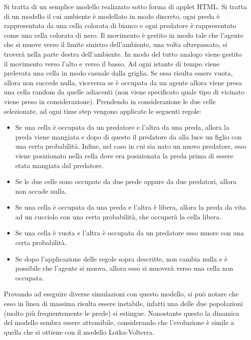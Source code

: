 \documentclass[11pt]{article}
\begin{document}
Si tratta di un semplice modello realizzato sotto forma di applet HTML. Si tratta di un modello il cui ambiente è modellato in modo discreto, ogni preda è rappresentata da una cella colorata di bianco e ogni predatore è rappresentato come una cella colorata di nero. Il movimento è gestito in modo tale che l'agente che si muove verso il limite sinistro dell'ambiente, una volta oltrepassato, si troverà nella parte destra dell'ambiente. In modo del tutto analogo viene gestito il movimento verso l'alto e verso il basso. Ad ogni istante di tempo viene prelevata una cella in modo casuale dalla griglia. Se essa risulta essere vuota, allora non succede nulla, viceversa se è occupata da un agente allora viene presa una cella random da quelle adiacenti (non viene specificato quale tipo di vicinato viene preso in considerazione). Prendendo in considerazione le due celle selezionate, ad ogni time step vengono applicate le seguenti regole\cite{PhysicsofRisk}:
\begin{itemize}
    \item Se una cella è occupata da un predatore e l'altra da una preda, allora la preda viene mangiata e dopo di questo il predatore da alla luce un figlio con una certa probabilità. Infine, nel caso in cui sia nato un nuovo predatore, esso viene posizionato nella cella dove era posizionata la preda prima di essere stata mangiata dal predatore.
    \item Se le due celle sono occupate da due prede oppure da due predatori, allora non accade nulla.
    \item Se una cella è occupata da una preda e l'altra è libera, allora la preda da vita ad un cucciolo con una certa probabilità, che occuperà la cella libera. 
    \item Se una cella è vuota e l'altra è occupata da un predatore esso muore con una certa probabilità. 
    \item Se dopo l'applicazione delle regole sopra descritte, non cambia nulla e è possibile che l'agente si muova, allora esso si muoverà verso una cella non occupata. 
\end{itemize}

Provando ad eseguire diverse simulazioni con questo modello, si può notare che esso in linea di massima risulta essere instabile, infatti una delle due popolazioni (molto più frequentemente le prede) si estingue. Nonostante questo la dinamica del modello sembra essere attensibile, considerando che l'evoluzione è simile a quella che si ottiene con il modello Lotka-Volterra. 
\end{document}
